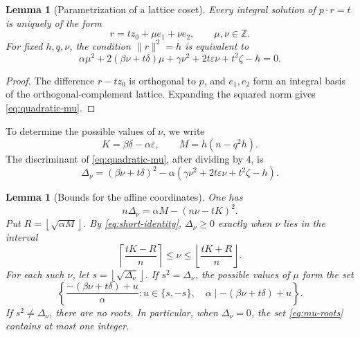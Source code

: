 \documentclass[11pt]{amsart}
\newtheorem{lemma}[theorem]{Lemma}
\theoremstyle{definition}
\theoremstyle{remark}
\newcommand{\Z}{\mathbb Z}
\newcommand{\ceil}[1]{\left\lceil #1\right\rceil}
\newcommand{\floor}[1]{\left\lfloor #1\right\rfloor}
\begin{document}
\begin{lemma}[Parametrization of a lattice coset]\label{lem:affine-coset}
Every integral solution of $p\cdot r=t$ is uniquely of the form
\[
 r=tz_0+\mu e_1+\nu e_2,
 \qquad \mu,\nu\in\Z.
\]
For fixed $h,q,\nu$, the condition $\|r\|^2=h$ is equivalent to
\begin{equation}\label{eq:quadratic-mu}
 \alpha\mu^2+2(\beta\nu+t\delta)\mu
 +\gamma\nu^2+2t\varepsilon\nu+t^2\zeta-h=0.
\end{equation}
\end{lemma}

\begin{proof}
The difference $r-tz_0$ is orthogonal to $p$, and $e_1,e_2$ form an integral
basis of the orthogonal-complement lattice.  Expanding the squared norm gives
\eqref{eq:quadratic-mu}.
\end{proof}

To determine the possible values of $\nu$, we write
\[
 K=\beta\delta-\alpha\varepsilon,
 \qquad
 M=h(n-q^2h).
\]
The discriminant of \eqref{eq:quadratic-mu}, after dividing by $4$, is
\[
 \Delta_\nu=(\beta\nu+t\delta)^2-
 \alpha(\gamma\nu^2+2t\varepsilon\nu+t^2\zeta-h).
\]

\begin{lemma}[Bounds for the affine coordinates]\label{lem:short-interval}
One has
\begin{equation}\label{eq:short-identity}
 n\Delta_\nu=\alpha M-(n\nu-tK)^2.
\end{equation}
Put $R=\floor{\sqrt{\alpha M}}$.  By \eqref{eq:short-identity},
$\Delta_\nu\ge0$ exactly when $\nu$ lies in the interval
\begin{equation}\label{eq:nu-interval}
 \ceil{\frac{tK-R}{n}}
 \le \nu\le
 \floor{\frac{tK+R}{n}}.
\end{equation}
For each such $\nu$, let $s=\floor{\sqrt{\Delta_\nu}}$.  If
$s^2=\Delta_\nu$, the possible values of $\mu$ form the set
\begin{equation}\label{eq:mu-roots}
 \left\{
 \frac{-(\beta\nu+t\delta)+u}{\alpha}:
 u\in\{s,-s\},\quad
 \alpha\mid-(\beta\nu+t\delta)+u
 \right\}.
\end{equation}
If $s^2\ne\Delta_\nu$, there are no roots.  In particular, when
$\Delta_\nu=0$, the set \eqref{eq:mu-roots} contains at most one integer.
\end{lemma}
\end{document}

